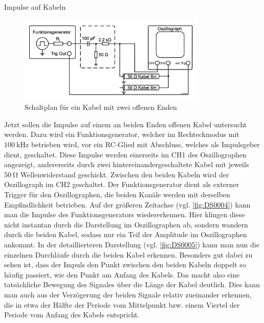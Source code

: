 \documentclass[ngerman]{scrartcl}
\theoremstyle{definition}
\begin{document}
		\begin{aufgabe}{Impulse auf Kabeln}
			\aufbau
			\begin{figure}[H]
				\centering
				\includegraphics[width=0.8\textwidth]{figs/Aufbau_1_2_Impulse_auf_Kabeln.png}
				\caption{Schaltplan für ein Kabel mit zwei offenen Enden~\cite{anleitung}}
				\label{fig:aufbau_1_1_impulseAufKabeln}
			\end{figure}
			Jetzt sollen die Impulse auf einem an beiden Enden offenen Kabel untersucht werden. Dazu wird ein Funktionsgenerator, welcher im Rechteckmodus mit $\SI{100}{\kilo\hertz}$ betrieben wird, vor ein RC-Glied mit Abschluss, welches als Impulsgeber dient, geschaltet. Diese Impulse werden einerseits im CH1 des Oszillographen angezeigt, andererseits durch zwei hintereinandergeschaltete Kabel mit jeweils $\SI{50}{\ohm}$ Wellenwiderstand geschickt. Zwischen den beiden Kabeln wird der Oszillograph im CH2 geschaltet. Der Funktionsgenerator dient als externer Trigger für den Oszillographen, die beiden Kanäle werden mit derselben Empfindlichkeit betrieben.
			\auswertung
			Auf der größeren Zeitachse (vgl. \ref{fig:DS0004}) kann man die Impulse des Funktionsgenerators wiedererkennen. Hier klingen diese nicht instantan durch die Darstellung im Oszillographen ab, sondern wandern durch die beiden Kabel, sodass nur ein Teil der Amplitude im Oszillographen ankommt. In der detaillierteren Darstellung (vgl. \ref{fig:DS0005}) kann man nun die einzelnen Durchläufe durch die beiden Kabel erkennen. Besonders gut dabei zu sehen ist, dass der Impuls den Punkt zwischen den beiden Kabeln doppelt so häufig passiert, wie den Punkt am Anfang des Kabels. Das macht also eine tatsächliche Bewegung des Signales über die Länge der Kabel deutlich. Dies kann man auch aus der Verzögerung der beiden Signale relativ zueinander erkennen, die in etwa der Hälfte der Periode vom Mittelpunkt bzw. einem Viertel der Periode vom Anfang des Kabels entspricht. 
			\messwerte
			\begin{figure}[H]
				\centering

\end{figure}
\end{aufgabe}
\end{document}
